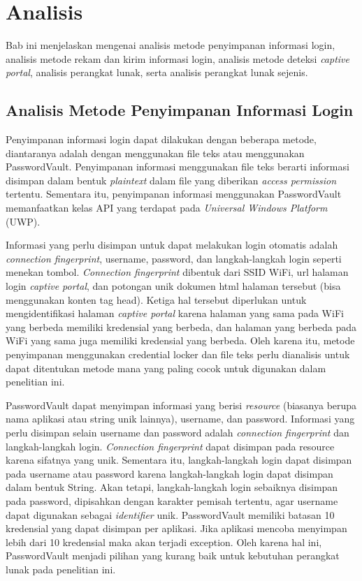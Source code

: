 \chapter{Analisis}
\label{chap:analisis}

Bab ini menjelaskan mengenai analisis metode penyimpanan informasi login, analisis metode rekam dan kirim informasi login, analisis metode deteksi \textit{captive portal}, analisis perangkat lunak, serta analisis perangkat lunak sejenis.

\section{Analisis Metode Penyimpanan Informasi Login}
\label{sec:metode_penyimpanan}

Penyimpanan informasi login dapat dilakukan dengan beberapa metode, diantaranya adalah dengan menggunakan file teks atau menggunakan PasswordVault. Penyimpanan informasi menggunakan file teks berarti informasi disimpan dalam bentuk \textit{plaintext} dalam file yang diberikan \textit{access permission} tertentu. Sementara itu, penyimpanan informasi menggunakan PasswordVault memanfaatkan kelas API yang terdapat pada \textit{Universal Windows Platform} (UWP).

Informasi yang perlu disimpan untuk dapat melakukan login otomatis adalah \textit{connection fingerprint}, username, password, dan langkah-langkah login seperti menekan tombol. \textit{Connection fingerprint} dibentuk dari SSID WiFi, url halaman login \textit{captive portal}, dan potongan unik dokumen html halaman tersebut (bisa menggunakan konten tag head). Ketiga hal tersebut diperlukan untuk mengidentifikasi halaman \textit{captive portal} karena halaman yang sama pada WiFi yang berbeda memiliki kredensial yang berbeda, dan halaman yang berbeda pada WiFi yang sama juga memiliki kredensial yang berbeda. Oleh karena itu, metode penyimpanan menggunakan credential locker dan file teks perlu dianalisis untuk dapat ditentukan metode mana yang paling cocok untuk digunakan dalam penelitian ini.

PasswordVault dapat menyimpan informasi yang berisi \textit{resource} (biasanya berupa nama aplikasi atau string unik lainnya), username, dan password. Informasi yang perlu disimpan selain username dan password adalah \textit{connection fingerprint} dan langkah-langkah login. \textit{Connection fingerprint} dapat disimpan pada resource karena sifatnya yang unik. Sementara itu, langkah-langkah login dapat disimpan pada username atau password karena langkah-langkah login dapat disimpan dalam bentuk String. Akan tetapi, langkah-langkah login sebaiknya disimpan pada password, dipisahkan dengan karakter pemisah tertentu, agar username dapat digunakan sebagai \textit{identifier} unik. PasswordVault memiliki batasan 10 kredensial yang dapat disimpan per aplikasi. Jika aplikasi mencoba menyimpan lebih dari 10 kredensial maka akan terjadi exception. Oleh karena hal ini, PasswordVault menjadi pilihan yang kurang baik untuk kebutuhan perangkat lunak pada penelitian ini.

